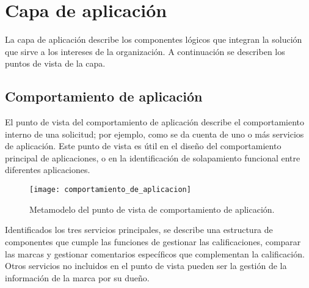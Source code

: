 
\chapter{Capa de aplicación}

La capa de aplicación describe los componentes lógicos que integran la solución que sirve a los intereses de la organización. A continuación se describen los puntos de vista de la capa.

\section{Comportamiento de aplicación}
El punto de vista del comportamiento de aplicación describe el comportamiento interno de una solicitud; por ejemplo, como se da cuenta de uno o más servicios de aplicación. Este punto de vista es útil en el diseño del comportamiento principal de aplicaciones, o en la identificación de solapamiento funcional entre diferentes aplicaciones.

\begin{figure}[H]
\centering
\texttt{[image: comportamiento\_de\_aplicacion]}
\caption{Metamodelo del punto de vista de comportamiento de aplicación.}
\end{figure}


Identificados los tres servicios principales, se describe una estructura de componentes que cumple las funciones de gestionar las calificaciones, comparar las marcas y gestionar comentarios específicos que complementan la calificación. Otros servicios no incluidos en el punto de vista pueden ser la gestión de la información de la marca por su dueño.

